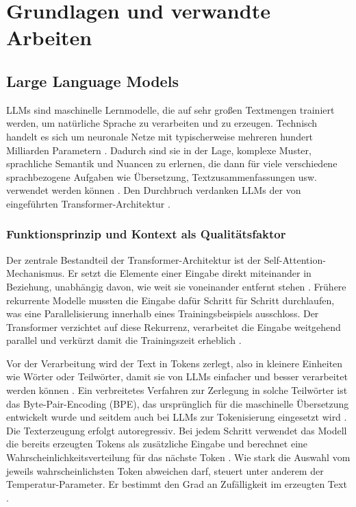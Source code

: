 \newpage
\section{Grundlagen und verwandte Arbeiten}

\subsection{Large Language Models}

 \acp{LLM} sind maschinelle Lernmodelle, die auf sehr großen Textmengen trainiert werden, um natürliche Sprache zu verarbeiten und zu erzeugen. Technisch handelt es sich um neuronale Netze mit typischerweise mehreren hundert Milliarden Parametern \parencite[S.~4]{zhao_survey_2026}. Dadurch sind sie in der Lage, komplexe Muster, sprachliche Semantik und Nuancen zu erlernen, die dann für viele verschiedene sprachbezogene Aufgaben wie Übersetzung, Textzusammenfassungen usw. verwendet werden können \parencite[S.~2]{celik_review_2025}. Den Durchbruch verdanken \acp{LLM} der von \textcite{vaswani_attention_2017} eingeführten Transformer-Architektur \parencite[S.~2]{celik_review_2025}.

\subsubsection{Funktionsprinzip und Kontext als Qualitätsfaktor}

Der zentrale Bestandteil der Transformer-Architektur ist der Self-Attention-Mechanismus. Er setzt die Elemente einer Eingabe direkt miteinander in Beziehung, unabhängig davon, wie weit sie voneinander entfernt stehen \parencite[S.~6]{vaswani_attention_2017}. Frühere rekurrente Modelle mussten die Eingabe dafür Schritt für Schritt durchlaufen, was eine Parallelisierung innerhalb eines Trainingsbeispiels ausschloss. Der Transformer verzichtet auf diese Rekurrenz, verarbeitet die Eingabe weitgehend parallel und verkürzt damit die Trainingszeit erheblich \parencite[S.~1]{vaswani_attention_2017}. 

Vor der Verarbeitung wird der Text in Tokens zerlegt, also in kleinere Einheiten wie Wörter oder Teilwörter, damit sie von \acp{LLM} einfacher und besser verarbeitet werden können \parencite[S.~18]{hou_large_2024}. Ein verbreitetes Verfahren zur Zerlegung in solche Teilwörter ist das Byte-Pair-Encoding (BPE), das ursprünglich für die maschinelle Übersetzung entwickelt wurde \parencite[S.~2]{sennrich_neural_2016} und seitdem auch bei \acp{LLM} zur Tokenisierung eingesetzt wird \parencite[S.~19]{zhao_survey_2026}. Die Texterzeugung erfolgt autoregressiv. Bei jedem Schritt verwendet das Modell die bereits erzeugten Tokens als zusätzliche Eingabe und berechnet eine Wahrscheinlichkeitsverteilung für das nächste Token \parencite[S.~2,~5]{vaswani_attention_2017}. Wie stark die Auswahl vom jeweils wahrscheinlichsten Token abweichen darf, steuert unter anderem der Temperatur-Parameter. Er bestimmt den Grad an Zufälligkeit im erzeugten Text \parencite[S.~4]{plein_automatic_2023}.


